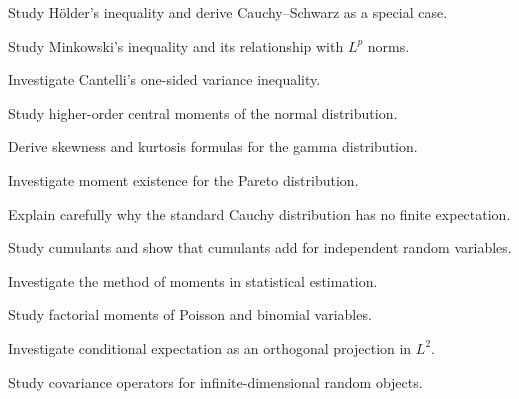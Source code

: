 \begin{exercise}[4]
Study Hölder's inequality and derive Cauchy--Schwarz as a special case.
\end{exercise}

\begin{exercise}[4]
Study Minkowski's inequality and its relationship with \(L^p\) norms.
\end{exercise}

\begin{exercise}[4]
Investigate Cantelli's one-sided variance inequality.
\end{exercise}

\begin{exercise}[4]
Study higher-order central moments of the normal distribution.
\end{exercise}

\begin{exercise}[4]
Derive skewness and kurtosis formulas for the gamma distribution.
\end{exercise}

\begin{exercise}[4]
Investigate moment existence for the Pareto distribution.
\end{exercise}

\begin{exercise}[4]
Explain carefully why the standard Cauchy distribution has no finite
expectation.
\end{exercise}

\begin{exercise}[4]
Study cumulants and show that cumulants add for independent random
variables.
\end{exercise}

\begin{exercise}[4]
Investigate the method of moments in statistical estimation.
\end{exercise}

\begin{exercise}[4]
Study factorial moments of Poisson and binomial variables.
\end{exercise}

\begin{exercise}[4]
Investigate conditional expectation as an orthogonal projection in
\(L^2\).
\end{exercise}

\begin{exercise}[4]
Study covariance operators for infinite-dimensional random objects.
\end{exercise}

